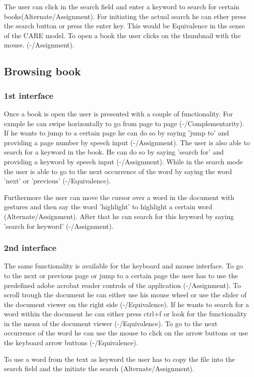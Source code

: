 \documentclass[a4paper, 10pt]{article}
\begin{document}
	\par{The user can click in the search field and enter a keyword to search for certain books(Alternate/Assignment). For initiating the actual search he can ether press the search button or press the enter key. This would be Equivalence in the sense of the CARE model. To open a book the user clicks on the thumbnail with the mouse. (-/Assignment).}
	
	\subsection{Browsing book}
	
	\subsubsection{1st interface}
	
	\par{Once a book is open the user is presented with a couple of functionality. For exmple he can swipe horizontally to go from page to page (-/Complementarity). If he wants to jump to a certain page he can do so by saying 'jump to' and providing a page number by speech input (-/Assignment). The user is also able to search for a keyword in the book. He can do so by saying 'search for' and providing a keyword by speech input (-/Assignment). While in the search mode the user is able to go to the next occurrence of the word by saying the word 'next' or 'previous' (-/Equivalence).}
	\par{Furthermore the user can move the cursor over a word in the document with gestures and then say the word 'highlight' to highlight a certain word (Alternate/Assignment). After that he can search for this keyword by saying 'search for keyword' (-/Assignment).  }
	
	\subsubsection{2nd interface}
	
	\par{The same functionality is available for the keyboard and mouse interface. To go to the next or previous page or jump to a certain page the user has to use the predefined adobe acrobat reader controls of the application (-/Assignment). To scroll trough the document he can either use his mouse wheel or use the slider of the document viewer on the right side (-/Equivalence). If he wants to search for a word within the document he can either press ctrl+f or look for the functionality in the menu of the document viewer (-/Equivalence). To go to the next occurrence of the word he can use the mouse to click on the arrow buttons or use the keyboard arrow buttons (-/Equivalence).}
	\par{To use a word from the text as keyword the user has to copy the file into the search field and the initiate the search (Alternate/Assignment).}
	
\end{document}
